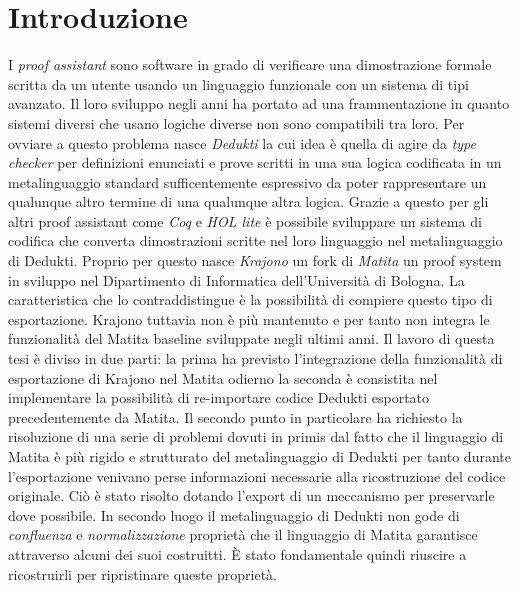 \documentclass[12pta4paper]{report}
\begin{document}
\chapter*{Introduzione}
I \textit{proof assistant } sono software in grado di verificare una dimostrazione
formale scritta da un utente usando un linguaggio funzionale con un sistema di
tipi avanzato. Il loro sviluppo negli anni ha portato ad una frammentazione
in quanto sistemi diversi che usano logiche diverse non sono compatibili tra 
loro. Per ovviare a questo problema nasce \textit{Dedukti} la cui idea è quella
di agire da \textit{type checker} per definizioni enunciati e prove scritti in
una sua logica codificata in un metalinguaggio standard sufficentemente espressivo 
da poter rappresentare un qualunque altro termine di una qualunque altra logica. Grazie
a questo per gli altri proof assistant come \textit{Coq} e \textit{HOL lite} è possibile sviluppare
un sistema di codifica che converta dimostrazioni scritte nel loro linguaggio 
nel metalinguaggio di Dedukti. Proprio per questo nasce \textit{Krajono} un
fork di \textit{Matita} un proof system  in sviluppo nel Dipartimento 
di Informatica dell'Università di Bologna. La caratteristica che lo contraddistingue
è la possibilità di compiere questo tipo di esportazione. Krajono tuttavia non
è più mantenuto e per tanto non integra le funzionalità del Matita baseline sviluppate negli ultimi anni.
Il lavoro di questa tesi è diviso in due parti: la prima ha previsto l'integrazione
della funzionalità di esportazione di Krajono nel Matita odierno la seconda è
consistita nel implementare la possibilità di re-importare codice Dedukti
esportato precedentemente da Matita. Il secondo punto in particolare ha richiesto
la risoluzione di una serie di problemi dovuti in primis dal fatto che il
linguaggio di Matita è più rigido e strutturato del metalinguaggio di Dedukti
per tanto durante l'esportazione venivano perse informazioni necessarie alla
ricostruzione del codice originale. Ciò è stato risolto dotando l'export di
un meccanismo per preservarle dove possibile. In secondo luogo il metalinguaggio 
di Dedukti non gode di \textit{confluenza} e \textit{normalizzazione} proprietà 
che il linguaggio di Matita garantisce attraverso alcuni dei suoi costruitti.
È stato fondamentale quindi riuscire a ricostruirli per ripristinare queste proprietà.
\end{document}
